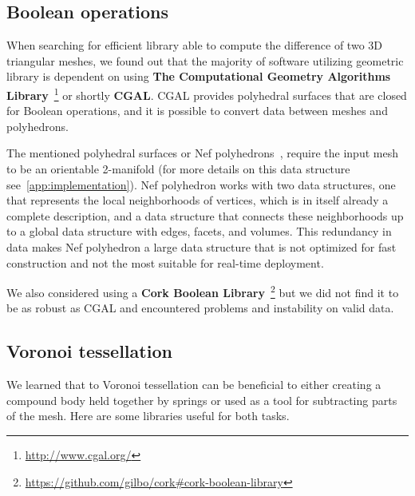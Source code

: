 \subsection{Boolean operations}
When searching for efficient library able to compute the difference of two 3D triangular meshes, we found out that the majority of software utilizing geometric library
is dependent on using \textbf{The Computational Geometry Algorithms Library}~\footnote{\url{http://www.cgal.org/}} or shortly \textbf{CGAL}. CGAL provides polyhedral surfaces that are closed for Boolean operations, and it is possible to convert data between meshes and polyhedrons. 

The mentioned polyhedral surfaces or Nef polyhedrons~\cite{nefpoly}, require the input mesh to be an orientable 2-manifold (for more details on this data structure see~\cref{app:implementation}). Nef polyhedron works with two data structures, one that represents the local neighborhoods of vertices, which is in itself already a complete description, and a data structure that connects these neighborhoods up to a global data structure with edges, facets, and volumes. This redundancy in data makes Nef polyhedron a large data structure that is not optimized for fast construction and not the most suitable for real-time deployment.

We also considered using a \textbf{Cork Boolean Library}~\footnote{\url{https://github.com/gilbo/cork\#cork-boolean-library}} but we did not find it to be as robust as CGAL and encountered problems and instability on valid data.

\subsection{Voronoi tessellation}
We learned that to Voronoi tessellation can be beneficial to either creating a compound body held together by springs or used as a tool for subtracting parts of the mesh. Here are some libraries useful for both tasks.

